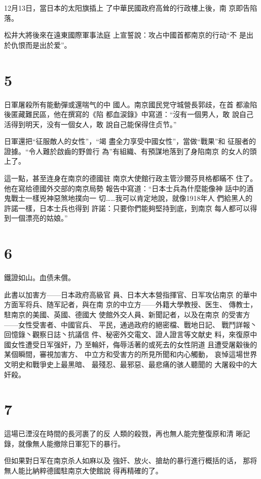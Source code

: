 \documentclass[12pt,UTF8]{ctexbook}
\begin{document}
12月13日，當日本的太阳旗插上
了中華民國政府高耸的行政樓上後，南
京即告陷落。

松井大將後來在遠東國際軍事法庭
上宣誓說：攻占中國首都南京的行动“不
是出於仇恨而是出於爱”。

\section{5}

日軍屠殺所有能動彈或還喘气的中
國人。南京國民党守城營長郭歧，在首
都渝陷後匿藏難民區，他在撰寫的《陷
都血涙錄》中寫道：“沒有一個男人，敢
說自己活得到明天，没有一個女人，敢
說自己能保得住贞节。”

日軍還把“征服敵人的女性”，“竭
盡全力享受中國女性”，當做“戰果”和
征服者的證據。“令人難於啟齒的野兽行
為”有組織、有預謀地落到了身陷南京
的女人的頭上了。

這一點，甚至连身在南京的德國驻
南京大使館行政主管沙爾芬貝格都瞞不
住了。他在寫给德國外交部的南京局勢
報告中寫道：“日本士兵為什麼能像神
話中的酒鬼戰士一樣兇神惡煞地撲向一
切……我可以肯定地說，就像1918年人
們給黑人的許諾一樣，日本士兵也得到
許諾：只要你們能夠堅持到底，到南京
每人都可以得到一個漂亮的姑娘。”

\section{6}

鐵證如山。血债未償。

此書以加害方——日本政府高級官
員、日本大本營指揮官、日军攻佔南京
的華中方面军将兵、随军記者，與在南
京的中立方——外籍大學教授、医生、
傳教士，駐南京的美國、英國、德國大
使館外交人員、新聞記者，以及在南京
的受害方——女性受害者、中國官兵、
平民，通過政府的絕密檔、戰地日記、
戰鬥詳報丶回憶錄丶觀察日誌丶抗議信
件、秘密外交電文、證人證言等文献史
料，來復原中國女性遭受日军强奸，乃
至輪奸，侮辱活著的或死去的女性阴道
且遭受屠觳後的某個瞬間，審視加害方、
中立方和受害方的所見所聞和内心觸動，
哀悼這場世界文明史和戰爭史上最黑暗、
最殘忍、最邪惡、最悲痛的骇人聽聞的
大屠殺中的大奸殺。

\section{7}

這場已湮沒在時間的長河裹了的反
人類的殺戮，再也無人能完整復原和清
晰記錄，就像無人能撤除日軍犯下的暴行。

但如果對日军在南京杀人如麻以及
強奸、放火、搶劫的暴行進行概括的话，
那将無人能比納粹德國駐南京大使館說
得再精確的了。
\end{document}
